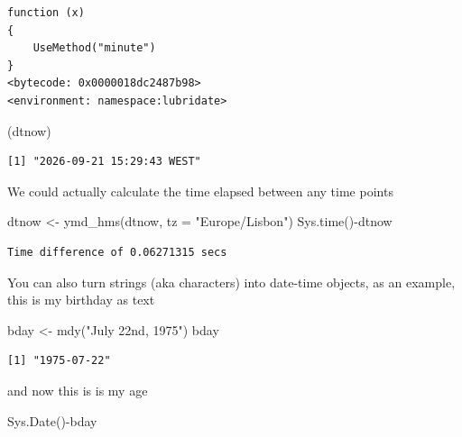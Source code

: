 \documentclass[
  letterpaper,
  DIV=11,
  numbers=noendperiod]{scrartcl}
\newenvironment{Shaded}{\begin{snugshade}}{\end{snugshade}}
\newcommand{\AttributeTok}[1]{\textcolor[rgb]{0.40,0.45,0.13}{#1}}
\newcommand{\FunctionTok}[1]{\textcolor[rgb]{0.28,0.35,0.67}{#1}}
\newcommand{\NormalTok}[1]{\textcolor[rgb]{0.00,0.23,0.31}{#1}}
\newcommand{\OtherTok}[1]{\textcolor[rgb]{0.00,0.23,0.31}{#1}}
\newcommand{\SpecialCharTok}[1]{\textcolor[rgb]{0.37,0.37,0.37}{#1}}
\newcommand{\StringTok}[1]{\textcolor[rgb]{0.13,0.47,0.30}{#1}}
\begin{document}
\begin{verbatim}
function (x) 
{
    UseMethod("minute")
}
<bytecode: 0x0000018dc2487b98>
<environment: namespace:lubridate>
\end{verbatim}

\begin{Shaded}
\begin{Highlighting}[]
\NormalTok{(dtnow)}
\end{Highlighting}
\end{Shaded}

\begin{verbatim}
[1] "2026-09-21 15:29:43 WEST"
\end{verbatim}

We could actually calculate the time elapsed between any time points

\begin{Shaded}
\begin{Highlighting}[]
\NormalTok{dtnow }\OtherTok{\textless{}{-}} \FunctionTok{ymd\_hms}\NormalTok{(dtnow, }\AttributeTok{tz =} \StringTok{"Europe/Lisbon"}\NormalTok{)}
\FunctionTok{Sys.time}\NormalTok{()}\SpecialCharTok{{-}}\NormalTok{dtnow}
\end{Highlighting}
\end{Shaded}

\begin{verbatim}
Time difference of 0.06271315 secs
\end{verbatim}

You can also turn strings (aka characters) into date-time objects, as an
example, this is my birthday as text

\begin{Shaded}
\begin{Highlighting}[]
\NormalTok{bday }\OtherTok{\textless{}{-}} \FunctionTok{mdy}\NormalTok{(}\StringTok{"July 22nd, 1975"}\NormalTok{)}
\NormalTok{bday}
\end{Highlighting}
\end{Shaded}

\begin{verbatim}
[1] "1975-07-22"
\end{verbatim}

and now this is is my age

\begin{Shaded}
\begin{Highlighting}[]
\FunctionTok{Sys.Date}\NormalTok{()}\SpecialCharTok{{-}}\NormalTok{bday}
\end{Highlighting}
\end{Shaded}
\end{document}

